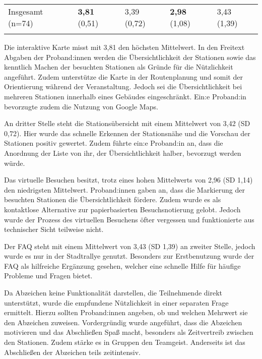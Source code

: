 \begin{table}[htpb]
\begin{tabularx}{\textwidth}{p{2.5cm}YYYY}
        \parbox[t][][t]{2.5cm}{Insgesamt (n=74)}                                & \textbf{3,81}
        \linebreak (0,51)                                                              & 3,39
        \linebreak (0,72) & \textbf{2,98}
        \linebreak (1,08) & 3,43
        \linebreak (1,39) \\
        \uzlhline
    \end{tabularx}
\end{table}

Die interaktive Karte misst mit 3,81 den höchsten Mittelwert. In den Freitext
Abgaben der Proband:innen werden die Übersichtlichkeit der Stationen sowie das
kenntlich Machen der besuchten Stationen als Gründe für die Nützlichkeit
angeführt. Zudem unterstütze die Karte in der Routenplanung und somit der
Orientierung während der Veranstaltung. Jedoch sei die Übersichtlichkeit bei
mehreren Stationen innerhalb eines Gebäudes eingeschränkt. Ein:e Proband:in
bevorzugte zudem die Nutzung von Google Maps.

An dritter Stelle steht die Stationsübersicht mit einem Mittelwert von 3,42 (SD
0,72). Hier wurde das schnelle Erkennen der Stationsnähe und die Vorschau der
Stationen positiv gewertet. Zudem führte ein:e Proband:in an, dass die Anordnung
der Liste von ihr, der Übersichtlichkeit halber, bevorzugt werden würde.

Das virtuelle Besuchen besitzt, trotz eines hohen Mittelwerts von 2,96 (SD 1,14)
den niedrigsten Mittelwert. Proband:innen gaben an, dass die Markierung der
besuchten Stationen die Übersichtlichkeit fördere. Zudem wurde es als
kontaktlose Alternative zur papierbasierten Besuchsnotierung gelobt. Jedoch
wurde der Prozess des virtuellen Besuchens öfter vergessen und funktionierte aus
technischer Sicht teilweise nicht.

Der FAQ steht mit einem Mittelwert von 3,43 (SD 1,39) an zweiter Stelle, jedoch
wurde es nur in der Stadtrallye genutzt. Besonders zur Erstbenutzung wurde der FAQ als hilfreiche Ergänzung gesehen, welcher eine schnelle Hilfe für häufige
Probleme und Fragen bietet.

Da Abzeichen keine Funktionalität darstellen, die Teilnehmende direkt
unterstützt, wurde die empfundene Nützlichkeit in einer separaten Frage
ermittelt. Hierzu sollten Proband:innen angeben, ob und welchen Mehrwert sie den
Abzeichen zuweisen. Vordergründig wurde angeführt, dass die Abzeichen motivieren
und das Abschließen Spaß macht, besonders als Zeitvertreib zwischen den
Stationen. Zudem stärke es in Gruppen den Teamgeist. Anderseits ist das
Abschließen der Abzeichen teils zeitintensiv.

